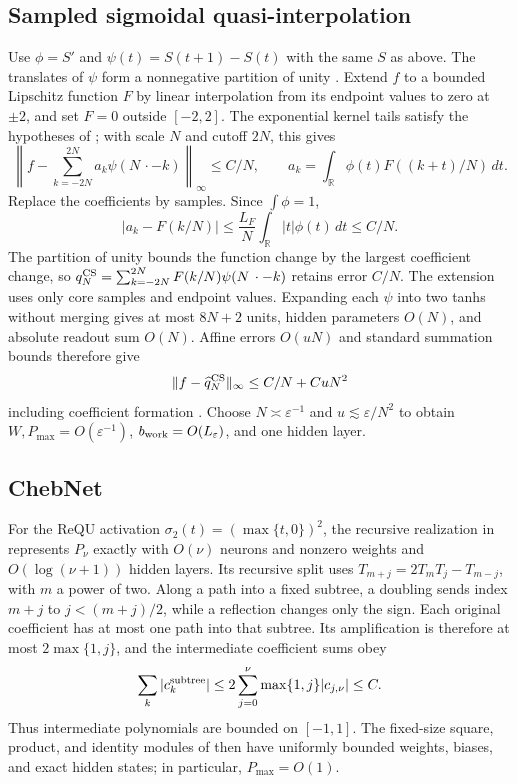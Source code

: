 \subsection{Sampled sigmoidal quasi-interpolation}
Use $\phi=S'$ and $\psi(t)=S(t+1)-S(t)$ with the same $S$ as above.
The translates of $\psi$ form a nonnegative partition of unity
\cite[Lemma~5.1]{Costarelli2015Approximation}. Extend $f$ to a bounded
Lipschitz function $F$ by linear interpolation from its endpoint values to
zero at $\pm2$, and set $F=0$ outside $[-2,2]$. The exponential kernel
tails satisfy the hypotheses of \cite[Theorem~5.4(ii)]{Costarelli2015Approximation}; with scale
$N$ and cutoff $2N$, this gives
\begin{equation}
 \left\|f-\sum_{k=-2N}^{2N}a_k\psi(N\,\cdot-k)\right\|_\infty\le C/N,
 \qquad a_k=\int_{\mathbb R}\phi(t)F((k+t)/N)\,dt.
 \label{eq:cmp-cs-integral}
\end{equation}
Replace the coefficients by samples. Since $\int\phi=1$,
\[
 |a_k-F(k/N)|\le\frac{L_F}{N}\int_{\mathbb R}|t|\phi(t)\,dt\le C/N.
\]
The partition of unity bounds the function change by the largest coefficient
change, so $q_N^{\rm CS}=\sum_{k=-2N}^{2N}F(k/N)\psi(N\,\cdot-k)$ retains
error $C/N$. The extension uses only core samples and endpoint values.
Expanding each $\psi$ into two tanhs without merging gives at most $8N+2$
units, hidden parameters $O(N)$, and absolute readout sum $O(N)$.
Affine errors $O(uN)$ and standard summation bounds therefore give
\begin{equation}
 \|f-\widehat q_N^{\rm CS}\|_\infty\le C/N+CuN^2
 \label{eq:cmp-cs-error}
\end{equation}
including coefficient formation \cite[Chs.~3--4]{Higham2002}. Choose
$N\asymp\varepsilon^{-1}$ and $u\lesssim\varepsilon/N^2$ to obtain
$W,P_{\max}=O(\varepsilon^{-1})$, $b_{\rm work}=O(L_\varepsilon)$,
and one hidden layer.

\subsection{ChebNet}
For the ReQU activation $\sigma_2(t)=(\max\{t,0\})^2$, the recursive
realization in \cite[Sec.~2.1, Theorem~1, 2019 version]{tang2019chebnet}
represents $P_\nu$ exactly with $O(\nu)$ neurons
and nonzero weights and $O(\log(\nu+1))$ hidden layers. Its recursive split
uses $T_{m+j}=2T_mT_j-T_{m-j}$, with $m$ a power of two. Along a path into
a fixed subtree, a doubling sends index $m+j$ to $j<(m+j)/2$, while a
reflection changes only the sign. Each original coefficient has at most one
path into that subtree. Its amplification is therefore at most
$2\max\{1,j\}$, and the intermediate coefficient sums obey
\begin{equation}
 \sum_k|c_k^{\rm subtree}|
 \le2\sum_{j=0}^{\nu}\max\{1,j\}|c_{j,\nu}|\le C.
 \label{eq:cmp-chebnet-subtree}
\end{equation}
Thus intermediate polynomials are bounded on $[-1,1]$. The fixed-size square,
product, and identity modules of \cite[Lemma~2]{tang2019chebnet} then have
uniformly bounded weights, biases, and exact hidden states; in particular,
$P_{\max}=O(1)$.

